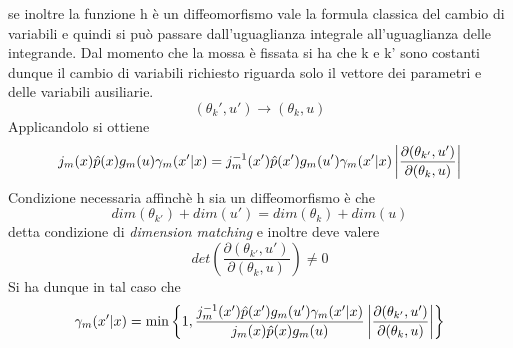 se inoltre la funzione h è un diffeomorfismo vale la formula classica del cambio
di variabili e quindi si può passare dall’uguaglianza integrale all’uguaglianza delle
integrande.
Dal momento che la mossa è fissata si ha che k e k' sono costanti dunque il cambio
di variabili richiesto riguarda solo il vettore dei parametri e delle variabili ausiliarie.
\begin{equation*}
(\theta_k',u')\rightarrow(\theta_k,u)
\end{equation*}
Applicandolo si ottiene
\begin{equation*}
j_m(x)\hat{p}(x)g_m(u)\gamma_m(x'|x)=
j_m^{-1}(x')\hat{p}(x')g_m(u')\gamma_m(x'|x)\left\vert\frac{\partial(\theta_{k'},u') }{\partial(\theta_{k},u) }\right\vert
\end{equation*}
Condizione necessaria affinchè h sia un diffeomorfismo è che
\begin{equation}
dim(\theta_{k'})+dim(u')=dim(\theta_{k})+dim(u)
\end{equation}
detta condizione di \emph{dimension matching} e inoltre deve valere
\begin{equation}
det\left(\frac{\partial(\theta_{k'},u') }{\partial(\theta_{k},u) }\right)\neq 0
\end{equation}
 Si ha dunque in tal caso che
\begin{equation}
\gamma_m(x'|x)=\min\left\lbrace 1,\frac{
j_m^{-1}(x')\hat{p}(x')g_m(u')\gamma_m(x'|x)}
{j_m(x)\hat{p}(x)g_m(u)}
\left\vert\frac{\partial(\theta_{k'},u') }{\partial(\theta_{k},u) }\right\vert 
\right\rbrace
\end{equation}